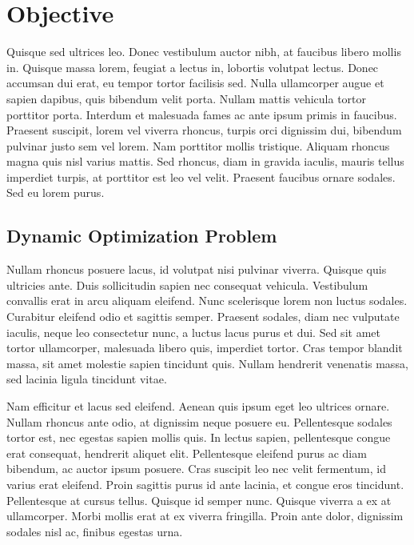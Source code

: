 \section{Objective}

Quisque sed ultrices leo. Donec vestibulum auctor nibh, at faucibus libero mollis in. Quisque massa lorem, feugiat a lectus in, lobortis volutpat lectus. Donec accumsan dui erat, eu tempor tortor facilisis sed. Nulla ullamcorper augue et sapien dapibus, quis bibendum velit porta. Nullam mattis vehicula tortor porttitor porta. Interdum et malesuada fames ac ante ipsum primis in faucibus. Praesent suscipit, lorem vel viverra rhoncus, turpis orci dignissim dui, bibendum pulvinar justo sem vel lorem. Nam porttitor mollis tristique. Aliquam rhoncus magna quis nisl varius mattis. Sed rhoncus, diam in gravida iaculis, mauris tellus imperdiet turpis, at porttitor est leo vel velit. Praesent faucibus ornare sodales. Sed eu lorem purus.  

\subsection{Dynamic Optimization Problem}

Nullam rhoncus posuere lacus, id volutpat nisi pulvinar viverra. Quisque quis ultricies ante. Duis sollicitudin sapien nec consequat vehicula. Vestibulum convallis erat in arcu aliquam eleifend. Nunc scelerisque lorem non luctus sodales. Curabitur eleifend odio et sagittis semper. Praesent sodales, diam nec vulputate iaculis, neque leo consectetur nunc, a luctus lacus purus et dui. Sed sit amet tortor ullamcorper, malesuada libero quis, imperdiet tortor. Cras tempor blandit massa, sit amet molestie sapien tincidunt quis. Nullam hendrerit venenatis massa, sed lacinia ligula tincidunt vitae.

Nam efficitur et lacus sed eleifend. Aenean quis ipsum eget leo ultrices ornare. Nullam rhoncus ante odio, at dignissim neque posuere eu. Pellentesque sodales tortor est, nec egestas sapien mollis quis. In lectus sapien, pellentesque congue erat consequat, hendrerit aliquet elit. Pellentesque eleifend purus ac diam bibendum, ac auctor ipsum posuere. Cras suscipit leo nec velit fermentum, id varius erat eleifend. Proin sagittis purus id ante lacinia, et congue eros tincidunt. Pellentesque at cursus tellus. Quisque id semper nunc. Quisque viverra a ex at ullamcorper. Morbi mollis erat at ex viverra fringilla. Proin ante dolor, dignissim sodales nisl ac, finibus egestas urna.

